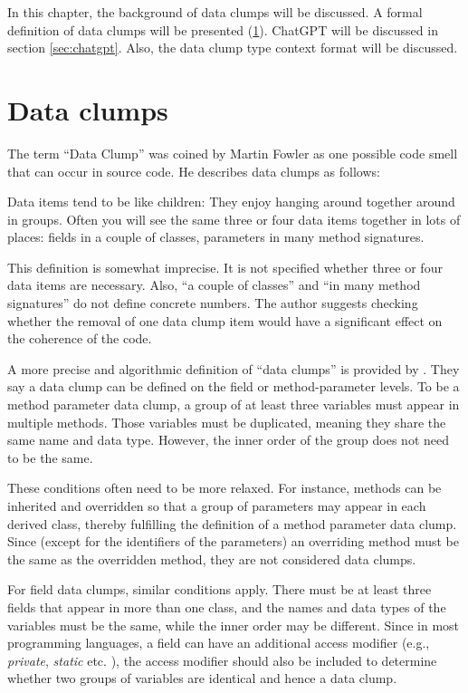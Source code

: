 In this chapter, the background of data clumps will be discussed. A formal definition of data clumps will be presented (\ref{sec:data_clump_def}). ChatGPT will be discussed in section \ref{sec:chatgpt}. Also, the data clump type context format will be discussed. 

\section{Data clumps}\label{sec:data_clump_def}
The term \enquote{Data Clump} was coined by Martin Fowler as one possible code smell that can occur in source code. He describes data clumps as follows:

\begin{displayquote}
Data items tend to be like children: They enjoy hanging around together around in groups. Often you will see
the same three or four data items together in lots of
places: fields in a couple of classes, parameters in many
method signatures. \cite{fowler2019refactoring} 
\end{displayquote}

This definition is somewhat imprecise. It is not specified whether three or four data items are necessary. Also, \enquote{a couple of classes} and \enquote{in many method signatures} do not define concrete numbers. The author suggests checking whether the removal of one data clump item would have a significant effect on the coherence of the code.

A more precise and algorithmic definition of \enquote{data clumps} is provided by \cite{zhangImprovingPrecisionFowler2008}. They say a data clump  can be defined on the field or method-parameter levels. 
To be a method parameter data clump, a group of at least three variables must appear in multiple methods. Those variables must be duplicated, meaning they share the same name and data type. However, the inner order of the group does not need to be the same. 

These conditions often need to be more relaxed. For instance, methods can be inherited and overridden so that a group of parameters may appear in each derived class, thereby fulfilling the definition of a method parameter data clump. Since (except for the identifiers of the parameters) an overriding method must be the same as the overridden method, they are not considered data clumps.

For field data clumps, similar conditions apply. There must be at least three fields that appear in more than one class, and the names and data types of the variables must be the same, while the inner order may be different. Since in most programming languages, a field can have an additional access modifier (e.g., \textit{private}, \textit{static} etc. ), the access modifier should also be included to determine whether two groups of variables are identical and hence a data clump.  

